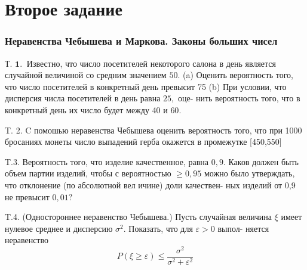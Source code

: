 \documentclass[a4paper,12pt]{article} %
\begin{document}
\clearpage
\part{Второе задание}


\section{Неравенства Чебышева и Маркова. Законы больших чисел}

\begin{example}

Т. $\mathbf{1 . ~}$ Известно, что число посетителей некоторого салона в день является случайной величиной со средним значением $50 .$
(a) Оценить вероятность того, что число посетителей в конкретный день превысит 75
(b) При условии, что дисперсия числа посетителей в день равна $25,$ оце-
нить вероятность того, что в конкретный день их число будет между 40 и $60 .$




\end{example}



\begin{example}

T. 2. $\mathrm{C}$ помошью неравенства Чебышева оценить вероятность того, что при 1000 бросаниях монеты число выпадений герба окажется в промежутке [450,550]




\end{example}



\begin{example}

T.3. Вероятность того, что изделие качественное, равна $0,9 .$ Каков должен быть объем партии изделий, чтобы с вероятностью $\geq 0,95$ можно было утверждать, что отклонение (по абсолютной вел ичине) доли качествен-
ных изделий от 0,9 не превысит $0,01 ?$




\end{example}





\begin{example}


T.4. (Одностороннее неравенство Чебышева.) Пусть случайная величина $\xi$ имеет нулевое среднее и дисперсию $\sigma^{2} .$ Показать, что для $\varepsilon>0$ выпол-
няется неравенство
$$
P(\xi \geq \varepsilon) \leq \frac{\sigma^{2}}{\sigma^{2}+\varepsilon^{2}}
$$



\end{example}
\end{document}
